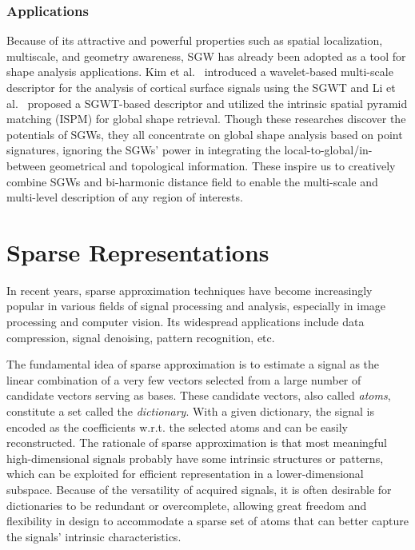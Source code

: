 \subsubsection*{Applications}

Because of its attractive and powerful properties such as
spatial localization, multiscale, and geometry awareness, SGW has
already been adopted as a tool for shape analysis applications.
Kim et al.~\cite{Kim:2012,Kim:2014}
introduced a wavelet-based multi-scale descriptor for the analysis of
cortical surface signals using the SGWT and Li et al.~\cite{Li:2013}
proposed a SGWT-based descriptor and utilized the intrinsic spatial
pyramid matching (ISPM) for global shape retrieval. Though these
researches discover the potentials of SGWs, they all concentrate on
global shape analysis based on point signatures, ignoring the SGWs'
power in integrating the local-to-global/in-between geometrical and
topological information. These inspire us to
creatively combine SGWs and bi-harmonic distance field to enable the
multi-scale and multi-level description of any region of interests.

\section{Sparse Representations}

In recent years, sparse approximation techniques have become
increasingly popular in various fields of signal processing and
analysis, especially in image processing and computer vision. Its
widespread applications include data compression, signal denoising,
pattern recognition, etc.

The fundamental idea of sparse approximation is to estimate a signal
as the linear combination of a very few vectors selected from a large
number of candidate vectors serving as bases. These candidate vectors,
also called \emph{atoms}, constitute a set called the
\emph{dictionary}. With a given dictionary, the signal is encoded as
the coefficients w.r.t. the selected atoms and can be easily
reconstructed. The rationale of sparse
approximation is that most meaningful high-dimensional signals probably
have some intrinsic structures or patterns, which can be exploited for
efficient representation in a lower-dimensional subspace. Because of
the versatility of acquired signals, it is often desirable for dictionaries to
be redundant or overcomplete, allowing great freedom and flexibility in
design to accommodate a sparse set of atoms that can better capture
the signals' intrinsic characteristics.

